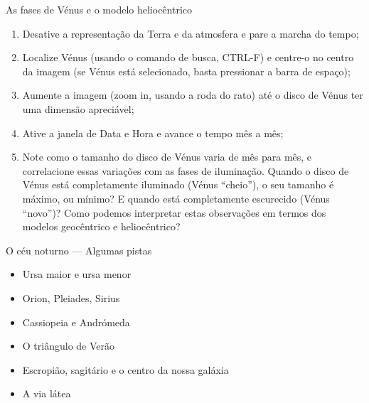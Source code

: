 \documentclass[beamer,9pt,aspectratio=169]{beamer}
\begin{document}
\begin{frame}{As fases de Vénus e o modelo heliocêntrico}
  \begin{enumerate}
      \setlength{\itemsep}{2em}
  \item
    Desative a representação da Terra e da atmosfera e pare a marcha do tempo;
  \item
    Localize Vénus (usando o comando de busca, CTRL-F) e centre-o no centro da
    imagem (se Vénus está selecionado, basta pressionar a barra de espaço);
  \item
    Aumente a imagem (zoom in, usando a roda do rato) até o disco de Vénus ter
    uma dimensão apreciável;
  \item
    Ative a janela de Data e Hora e avance o tempo mês a mês;
  \item
    Note como o tamanho do disco de Vénus varia de mês para mês, e correlacione
    essas variações com as fases de iluminação. Quando o disco de Vénus está
    completamente iluminado (Vénus ``cheio''), o seu tamanho é máximo, ou
    mínimo? E quando está completamente escurecido (Vénus ``novo'')? Como
    podemos interpretar estas observações em termos dos modelos geocêntrico e
    heliocêntrico?
\end{enumerate}
\end{frame}
\begin{frame}{O céu noturno --- Algumas pistas}
  \begin{itemize}
    \item Ursa maior e ursa menor
    \item Orion, Pleiades, Sirius
    \item Cassiopeia e Andrómeda
    \item O triângulo de Verão
    \item Escropião, sagitário e o centro da nossa galáxia
    \item A via látea
  \end{itemize}
\end{frame}
\end{document}
